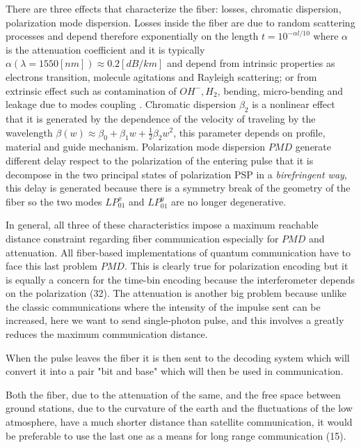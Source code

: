 There are three effects that characterize the fiber: losses, chromatic dispersion, polarization mode dispersion. Losses inside the fiber are due to random scattering processes and depend therefore exponentially on the length $t = 10^{-\alpha l / 10}$ where $\alpha$ is the attenuation coefficient and it is typically $\alpha(\lambda = 1550[nm]) \approx 0.2 [dB / km]$ and depend from intrinsic properties as electrons transition, molecule agitations and Rayleigh scattering; or from extrinsic effect such as contamination of $OH^-, H_2$, bending, micro-bending and leakage due to modes coupling . Chromatic dispersion $\beta_2$ is a nonlinear effect that it is generated by the dependence of the velocity of traveling by the wavelength $\beta(w) \approx \beta_0 + \beta_1 w + \frac{1}{2} \beta_2 w^2$, this parameter depends on profile, material and guide mechanism. Polarization mode dispersion $PMD$ generate different delay respect to the polarization of the entering pulse that it is decompose in the two principal states of polarization PSP in a \textit{birefringent way}, this delay is generated because there is a symmetry break of the geometry of the fiber so the two modes $LP_{01}^x$ and $LP_{01}^y$ are no longer degenerative.

In general, all three of these characteristics impose a maximum reachable distance constraint regarding fiber communication especially for $PMD$ and attenuation. All fiber-based implementations of quantum communication have to face this last problem $PMD $. This is clearly true for polarization encoding but it is equally a concern for the time-bin encoding because the interferometer depends on the polarization (32). The attenuation is another big problem because unlike the classic communications where the intensity of the impulse sent can be increased, here we want to send single-photon pulse, and this involves a greatly reduces the maximum communication distance.

When the pulse leaves the fiber it is then sent to the decoding system which will convert it into a pair "bit and base" which will then be used in communication.


Both the fiber, due to the attenuation of the same, and the free space between ground stations, due to the curvature of the earth and the fluctuations of the low atmosphere, have a much shorter distance than satellite communication, it would be preferable to use the last one as a means for long range communication (15).

